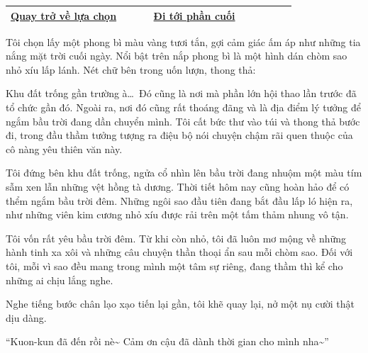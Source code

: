 \documentclass[../main.tex]{subfiles}
\begin{document}
\begin{table}[H]
  \centering
  \setlength{\arrayrulewidth}{1pt}
  \begin{tabular}{|>{\centering\arraybackslash}p{0.4\linewidth}|>{\centering\arraybackslash}p{0.4\linewidth}|}
    \hline
    \hyperref[choice]{Quay trở về lựa chọn} & \hyperref[ending]{Đi tới phần cuối} \\ \hline
  \end{tabular}
\end{table}

\newpage
\label{saya}

Tôi chọn lấy một phong bì màu vàng tươi tắn, gợi cảm giác ấm áp như những tia nắng mặt trời cuối ngày. Nổi bật trên nắp phong bì là một hình dán chòm sao nhỏ xíu lấp lánh. Nét chữ bên trong uốn lượn, thong thả:


Khu đất trống gần trường à\dots\ Đó cũng là nơi mà phần lớn hội thao lần trước đã tổ chức gần đó. Ngoài ra, nơi đó cũng rất thoáng đãng và là địa điểm lý tưởng để ngắm bầu trời đang dần chuyển mình. Tôi cất bức thư vào túi và thong thả bước đi, trong đầu thầm tưởng tượng ra điệu bộ nói chuyện chậm rãi quen thuộc của cô nàng yêu thiên văn này.

\ct


Tôi đứng bên khu đất trống, ngửa cổ nhìn lên bầu trời đang nhuộm một màu tím sẫm xen lẫn những vệt hồng tà dương. Thời tiết hôm nay cũng hoàn hảo để có thểm ngắm bầu trời đêm. Những ngôi sao đầu tiên đang bắt đầu lấp ló hiện ra, như những viên kim cương nhỏ xíu được rải trên một tấm thảm nhung vô tận.

Tôi vốn rất yêu bầu trời đêm. Từ khi còn nhỏ, tôi đã luôn mơ mộng về những hành tinh xa xôi và những câu chuyện thần thoại ẩn sau mỗi chòm sao. Đối với tôi, mỗi vì sao đều mang trong mình một tâm sự riêng, đang thầm thì kể cho những ai chịu lắng nghe.

Nghe tiếng bước chân lạo xạo tiến lại gần, tôi khẽ quay lại, nở một nụ cười thật dịu dàng.

``Kuon-kun đã đến rồi nè\~{} Cảm ơn cậu đã dành thời gian cho mình nha\~{}''
\end{document}
